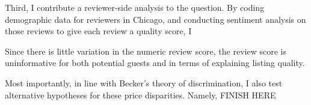Third, I contribute a reviewer-side analysis to the question. By coding demographic data for reviewers in Chicago, and conducting sentiment analysis on those reviews to give each review a quality score, I 

Since there is little variation in the numeric review score, the review score is uninformative for both potential guests and in terms of explaining listing quality. 

Most importantly, in line with Becker’s theory of discrimination, I also test alternative hypotheses for these price disparities. Namely, FINISH HERE












\begin{comment}
Structurally, African-Americans were denied Federal Housing Adminstration mortgages at the low interest rates that were offered to white families, redlining districts , predatory , among many other structural moving north during the Great Migration were met with  Shut out from One reason is  
Many efforts have been made to curb discrimination in the housing sector against African-Americans. Landmark federal legislation such as the Fair Housing Act of 1968 prohibits housing discrimination based on race, the enforcement of anti-discrimination legislation is difficult on the local level. Residential preferences, differences in family structure and availability of affordable housing contribute to these disparities. Discrimination in housing has also been cited as one of the primary causes of these inequities. 

Discrimination is difficult to measure. In the real world. Economists and other social scientists have long been concerned with the fact that minorities, especially African-Americans, have experienced pervasively lower living standards in the United States. One potential cause of this is discrimination in the housing market. 

Moreover, many small players have entered these markets who would have otherwise been unable to participate in traditional markets. Managing a room or home with Airbnb has much lower barriers to entry than being the landlord of a large apartment building. In just the 10 years since its founding, Airbnb has surpassed Marriott nearly three-fold in the number of rooms offered worldwide \citep{sharing}. 
\end{comment}

